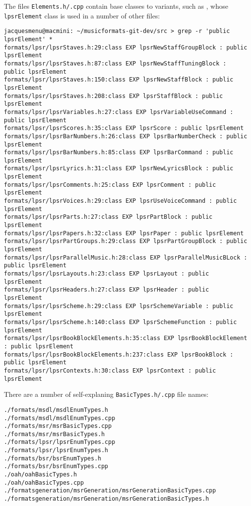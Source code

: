 The files {\tt *Elements.h/.cpp} contain base classes to variants, such as , whose {\tt lpsrElement} class   is used in a number of other files:
\begin{lstlisting}[language=Terminal]
jacquesmenu@macmini: ~/musicformats-git-dev/src > grep -r 'public lpsrElement' *
formats/lpsr/lpsrStaves.h:29:class EXP lpsrNewStaffGroupBlock : public lpsrElement
formats/lpsr/lpsrStaves.h:87:class EXP lpsrNewStaffTuningBlock : public lpsrElement
formats/lpsr/lpsrStaves.h:150:class EXP lpsrNewStaffBlock : public lpsrElement
formats/lpsr/lpsrStaves.h:208:class EXP lpsrStaffBlock : public lpsrElement
formats/lpsr/lpsrVariables.h:27:class EXP lpsrVariableUseCommand : public lpsrElement
formats/lpsr/lpsrScores.h:35:class EXP lpsrScore : public lpsrElement
formats/lpsr/lpsrBarNumbers.h:26:class EXP lpsrBarNumberCheck : public lpsrElement
formats/lpsr/lpsrBarNumbers.h:85:class EXP lpsrBarCommand : public lpsrElement
formats/lpsr/lpsrLyrics.h:31:class EXP lpsrNewLyricsBlock : public lpsrElement
formats/lpsr/lpsrComments.h:25:class EXP lpsrComment : public lpsrElement
formats/lpsr/lpsrVoices.h:29:class EXP lpsrUseVoiceCommand : public lpsrElement
formats/lpsr/lpsrParts.h:27:class EXP lpsrPartBlock : public lpsrElement
formats/lpsr/lpsrPapers.h:32:class EXP lpsrPaper : public lpsrElement
formats/lpsr/lpsrPartGroups.h:29:class EXP lpsrPartGroupBlock : public lpsrElement
formats/lpsr/lpsrParallelMusic.h:28:class EXP lpsrParallelMusicBLock : public lpsrElement
formats/lpsr/lpsrLayouts.h:23:class EXP lpsrLayout : public lpsrElement
formats/lpsr/lpsrHeaders.h:27:class EXP lpsrHeader : public lpsrElement
formats/lpsr/lpsrScheme.h:29:class EXP lpsrSchemeVariable : public lpsrElement
formats/lpsr/lpsrScheme.h:140:class EXP lpsrSchemeFunction : public lpsrElement
formats/lpsr/lpsrBookBlockElements.h:35:class EXP lpsrBookBlockElement : public lpsrElement
formats/lpsr/lpsrBookBlockElements.h:237:class EXP lpsrBookBlock : public lpsrElement
formats/lpsr/lpsrContexts.h:30:class EXP lpsrContext : public lpsrElement
\end{lstlisting}

\newpage

There are a number of self-explaning {\tt *BasicTypes.h/.cpp} file names:%
\begin{lstlisting}[language=Terminal]
./formats/msdl/msdlEnumTypes.h
./formats/msdl/msdlEnumTypes.cpp
./formats/msr/msrBasicTypes.cpp
./formats/msr/msrBasicTypes.h
./formats/lpsr/lpsrEnumTypes.cpp
./formats/lpsr/lpsrEnumTypes.h
./formats/bsr/bsrEnumTypes.h
./formats/bsr/bsrEnumTypes.cpp
./oah/oahBasicTypes.h
./oah/oahBasicTypes.cpp
./formatsgeneration/msrGeneration/msrGenerationBasicTypes.cpp
./formatsgeneration/msrGeneration/msrGenerationBasicTypes.h
\end{lstlisting}

